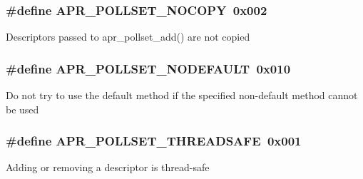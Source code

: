 \subsubsection[{\texorpdfstring{A\+P\+R\+\_\+\+P\+O\+L\+L\+S\+E\+T\+\_\+\+N\+O\+C\+O\+PY}{APR_POLLSET_NOCOPY}}]{\setlength{\rightskip}{0pt plus 5cm}\#define A\+P\+R\+\_\+\+P\+O\+L\+L\+S\+E\+T\+\_\+\+N\+O\+C\+O\+PY~0x002}\hypertarget{group__pollflags_ga0febaf4378d2705bf1256b22fe8dfd24}{}\label{group__pollflags_ga0febaf4378d2705bf1256b22fe8dfd24}
Descriptors passed to apr\+\_\+pollset\+\_\+add() are not copied 
\subsubsection[{\texorpdfstring{A\+P\+R\+\_\+\+P\+O\+L\+L\+S\+E\+T\+\_\+\+N\+O\+D\+E\+F\+A\+U\+LT}{APR_POLLSET_NODEFAULT}}]{\setlength{\rightskip}{0pt plus 5cm}\#define A\+P\+R\+\_\+\+P\+O\+L\+L\+S\+E\+T\+\_\+\+N\+O\+D\+E\+F\+A\+U\+LT~0x010}\hypertarget{group__pollflags_gaa46a9cbb23b2e8e71dd3ba88e69fdf13}{}\label{group__pollflags_gaa46a9cbb23b2e8e71dd3ba88e69fdf13}
Do not try to use the default method if the specified non-\/default method cannot be used 
\subsubsection[{\texorpdfstring{A\+P\+R\+\_\+\+P\+O\+L\+L\+S\+E\+T\+\_\+\+T\+H\+R\+E\+A\+D\+S\+A\+FE}{APR_POLLSET_THREADSAFE}}]{\setlength{\rightskip}{0pt plus 5cm}\#define A\+P\+R\+\_\+\+P\+O\+L\+L\+S\+E\+T\+\_\+\+T\+H\+R\+E\+A\+D\+S\+A\+FE~0x001}\hypertarget{group__pollflags_gabdfaccfd394c847f692351dee2e5ef7f}{}\label{group__pollflags_gabdfaccfd394c847f692351dee2e5ef7f}
Adding or removing a descriptor is thread-\/safe 

